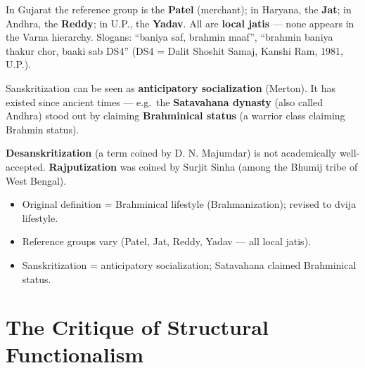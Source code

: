 \begin{ExampleBox}
In Gujarat the reference group is the \textbf{Patel} (merchant); in Haryana, the \textbf{Jat}; in Andhra, the \textbf{Reddy}; in U.P., the \textbf{Yadav}. All are \textbf{local jatis} --- none appears in the Varna hierarchy. Slogans: ``baniya saf, brahmin maaf'', ``brahmin baniya thakur chor, baaki sab DS4'' (DS4 = Dalit Shoshit Samaj, Kanshi Ram, 1981, U.P.).
\end{ExampleBox}

\begin{KeyConcept}
Sanskritization can be seen as \textbf{anticipatory socialization} (Merton). It has existed since ancient times --- e.g.\ the \textbf{Satavahana dynasty} (also called Andhra) stood out by claiming \textbf{Brahminical status} (a warrior class claiming Brahmin status).
\end{KeyConcept}

\begin{CriticalPoint}
\textbf{Desanskritization} (a term coined by D. N. Majumdar) is not academically well-accepted. \textbf{Rajputization} was coined by Surjit Sinha (among the Bhumij tribe of West Bengal).
\end{CriticalPoint}

\begin{QuickRevision}
\begin{itemize}
\item Original definition = Brahminical lifestyle (Brahmanization); revised to dvija lifestyle.
\item Reference groups vary (Patel, Jat, Reddy, Yadav --- all local jatis).
\item Sanskritization = anticipatory socialization; Satavahana claimed Brahminical status.
\end{itemize}
\end{QuickRevision}

\section{The Critique of Structural Functionalism}


